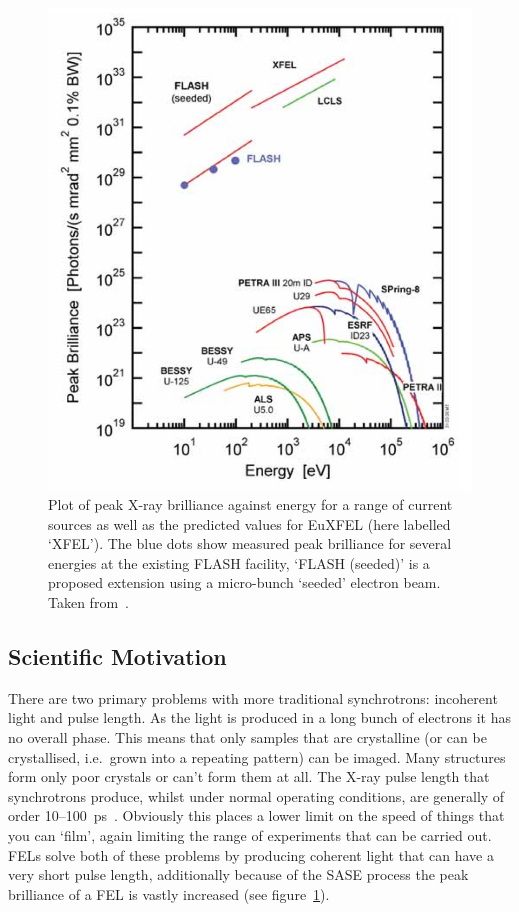 \begin{figure}[htbp]
  \centering
    \includegraphics[width=.9\textwidth]{images/Other/XFEL-comparitive_energy-brightness.png}
  \caption{Plot of peak X-ray brilliance against energy for a range of current sources as well as the predicted values for EuXFEL (here labelled `XFEL'). The blue dots show measured peak brilliance for several energies at the existing FLASH facility, `FLASH (seeded)' is a proposed extension using a micro-bunch `seeded' electron beam. Taken from~\cite{xfel_tdr}.}
  \label{fig:xfel-brightness}
\end{figure}

\subsection{Scientific Motivation} %
\label{sub:scientific_motivation}
There are two primary problems with more traditional synchrotrons: incoherent light and pulse length. As the light is produced in a long bunch of electrons it has no overall phase. This means that only samples that are crystalline (or can be crystallised, i.e.\ grown into a repeating pattern) can be imaged. Many structures form only poor crystals or can't form them at all. The X-ray pulse length that synchrotrons produce, whilst under normal operating conditions, are generally of order 10--100~ps~\cite{xfel_detector_requirements}. Obviously this places a lower limit on the speed of things that you can `film', again limiting the range of experiments that can be carried out. FELs solve both of these problems by producing coherent light that can have a very short pulse length, additionally because of the SASE process the peak brilliance of a FEL is vastly increased (see figure~\ref{fig:xfel-brightness}).

